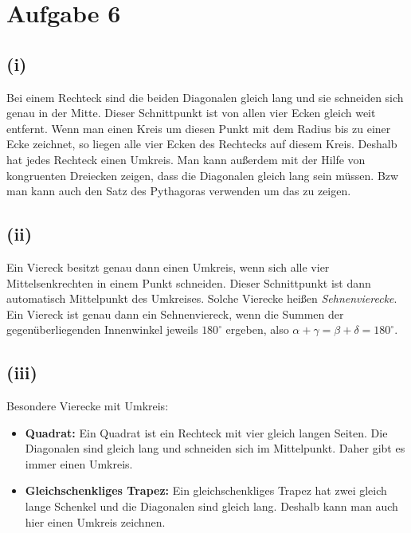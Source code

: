 \documentclass[12pt,a4paper]{article}
\begin{document}
\section*{Aufgabe 6}
\subsection*{(i)}
Bei einem Rechteck sind die beiden Diagonalen gleich lang und sie schneiden sich genau in der Mitte. Dieser Schnittpunkt ist von allen vier Ecken gleich weit entfernt. Wenn man einen Kreis um diesen Punkt mit dem Radius bis zu einer Ecke zeichnet, so liegen alle vier Ecken des Rechtecks auf diesem Kreis. Deshalb hat jedes Rechteck einen Umkreis. Man kann außerdem mit der Hilfe von kongruenten Dreiecken zeigen, dass die Diagonalen gleich lang sein müssen. Bzw man kann auch den Satz des Pythagoras verwenden um das zu zeigen.\\

\subsection*{(ii)}
Ein Viereck besitzt genau dann einen Umkreis, wenn sich alle vier Mittelsenkrechten in einem Punkt schneiden. Dieser Schnittpunkt ist dann automatisch Mittelpunkt des Umkreises.  Solche Vierecke heißen \emph{Sehnenvierecke}. Ein Viereck ist genau dann ein Sehnenviereck, wenn die Summen der gegenüberliegenden Innenwinkel jeweils $180^\circ$ ergeben, also $\alpha + \gamma = \beta + \delta = 180^\circ$. \\

\subsection*{(iii)}
Besondere Vierecke mit Umkreis:\\
\begin{itemize}
    \item \textbf{Quadrat:} Ein Quadrat ist ein Rechteck mit vier gleich langen Seiten. Die Diagonalen sind gleich lang und schneiden sich im Mittelpunkt. Daher gibt es immer einen Umkreis.
    \item \textbf{Gleichschenkliges Trapez:} Ein gleichschenkliges Trapez hat zwei gleich lange Schenkel und die Diagonalen sind gleich lang. Deshalb kann man auch hier einen Umkreis zeichnen.
\end{itemize}     

\newpage
\end{document}
